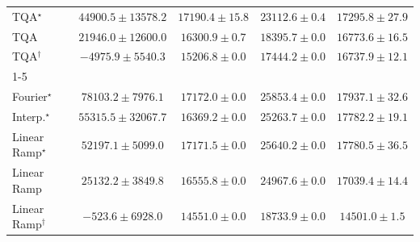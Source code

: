 \begin{tabular}{l|cccc|}
TQA$^\star$ & {\cellcolor[HTML]{F3801C}} \color[HTML]{F1F1F1} $44900.5\pm 13578.2$ & {\cellcolor[HTML]{FEE28E}} \color[HTML]{000000} $17190.4\pm 15.8$ & {\cellcolor[HTML]{FED069}} \color[HTML]{000000} $23112.6\pm 0.4$ & {\cellcolor[HTML]{FEE18C}} \color[HTML]{000000} $17295.8\pm 27.9$ \\
TQA & {\cellcolor[HTML]{FED471}} \color[HTML]{000000} $21946.0\pm 12600.0$ & {\cellcolor[HTML]{FEE392}} \color[HTML]{000000} $16300.9\pm 0.7$ & {\cellcolor[HTML]{FEDE86}} \color[HTML]{000000} $18395.7\pm 0.0$ & {\cellcolor[HTML]{FEE390}} \color[HTML]{000000} $16773.6\pm 16.5$ \\
TQA$^\dagger$ & {\cellcolor[HTML]{FFFFE5}} \color[HTML]{000000} $-4975.9\pm 5540.3$ & {\cellcolor[HTML]{FEE697}} \color[HTML]{000000} $15206.8\pm 0.0$ & {\cellcolor[HTML]{FEE18C}} \color[HTML]{000000} $17444.2\pm 0.0$ & {\cellcolor[HTML]{FEE390}} \color[HTML]{000000} $16737.9\pm 12.1$ \\
\cline{1-5}
\multicolumn{5}{c}{\rule{0pt}{8pt}PP} \\
\midrule
Fourier$^\star$ & {\cellcolor[HTML]{004F2D}} \color[HTML]{F1F1F1} $78103.2\pm 7976.1$ & {\cellcolor[HTML]{D7EFA2}} \color[HTML]{000000} $17172.0\pm 0.0$ & {\cellcolor[HTML]{B3E091}} \color[HTML]{000000} $25853.4\pm 0.0$ & {\cellcolor[HTML]{D5EEA1}} \color[HTML]{000000} $17937.1\pm 32.6$ \\
Interp.$^\star$ & {\cellcolor[HTML]{2F944E}} \color[HTML]{F1F1F1} $55315.5\pm 32067.7$ & {\cellcolor[HTML]{DAF0A4}} \color[HTML]{000000} $16369.2\pm 0.0$ & {\cellcolor[HTML]{B6E192}} \color[HTML]{000000} $25263.7\pm 0.0$ & {\cellcolor[HTML]{D5EEA1}} \color[HTML]{000000} $17782.2\pm 19.1$ \\
Linear Ramp$^\star$ & {\cellcolor[HTML]{389F55}} \color[HTML]{F1F1F1} $52197.1\pm 5099.0$ & {\cellcolor[HTML]{D7EFA2}} \color[HTML]{000000} $17171.5\pm 0.0$ & {\cellcolor[HTML]{B5E092}} \color[HTML]{000000} $25640.2\pm 0.0$ & {\cellcolor[HTML]{D5EEA1}} \color[HTML]{000000} $17780.5\pm 36.5$ \\
Linear Ramp & {\cellcolor[HTML]{B6E192}} \color[HTML]{000000} $25132.2\pm 3849.8$ & {\cellcolor[HTML]{DAF0A4}} \color[HTML]{000000} $16555.8\pm 0.0$ & {\cellcolor[HTML]{B8E293}} \color[HTML]{000000} $24967.6\pm 0.0$ & {\cellcolor[HTML]{D7EFA2}} \color[HTML]{000000} $17039.4\pm 14.4$ \\
Linear Ramp$^\dagger$ & {\cellcolor[HTML]{FCFED3}} \color[HTML]{000000} $-523.6\pm 6928.0$ & {\cellcolor[HTML]{DFF3A8}} \color[HTML]{000000} $14551.0\pm 0.0$ & {\cellcolor[HTML]{D0EC9F}} \color[HTML]{000000} $18733.9\pm 0.0$ & {\cellcolor[HTML]{DFF3A8}} \color[HTML]{000000} $14501.0\pm 1.5$ \\

\end{tabular}
